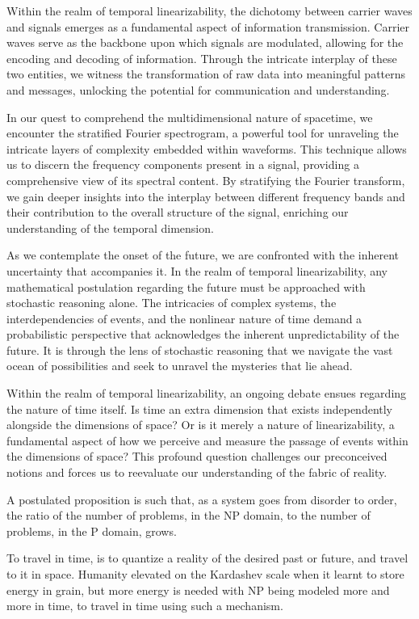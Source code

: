 \documentclass[ebook,12pt,oneside,openany]{memoir}
\begin{document}
\indent Within the realm of temporal linearizability, the dichotomy between carrier waves and signals emerges as a fundamental aspect of information transmission. Carrier waves serve as the backbone upon which signals are modulated, allowing for the encoding and decoding of information. Through the intricate interplay of these two entities, we witness the transformation of raw data into meaningful patterns and messages, unlocking the potential for communication and understanding.

\indent In our quest to comprehend the multidimensional nature of spacetime, we encounter the stratified Fourier spectrogram, a powerful tool for unraveling the intricate layers of complexity embedded within waveforms. This technique allows us to discern the frequency components present in a signal, providing a comprehensive view of its spectral content. By stratifying the Fourier transform, we gain deeper insights into the interplay between different frequency bands and their contribution to the overall structure of the signal, enriching our understanding of the temporal dimension.

\indent As we contemplate the onset of the future, we are confronted with the inherent uncertainty that accompanies it. In the realm of temporal linearizability, any mathematical postulation regarding the future must be approached with stochastic reasoning alone. The intricacies of complex systems, the interdependencies of events, and the nonlinear nature of time demand a probabilistic perspective that acknowledges the inherent unpredictability of the future. It is through the lens of stochastic reasoning that we navigate the vast ocean of possibilities and seek to unravel the mysteries that lie ahead.

\indent Within the realm of temporal linearizability, an ongoing debate ensues regarding the nature of time itself. Is time an extra dimension that exists independently alongside the dimensions of space? Or is it merely a nature of linearizability, a fundamental aspect of how we perceive and measure the passage of events within the dimensions of space? This profound question challenges our preconceived notions and forces us to reevaluate our understanding of the fabric of reality.

\indent A postulated proposition is such that, as a system goes from disorder to order, the ratio of the number of problems, in the NP domain, to the number of problems, in the P domain, grows.

\indent To travel in time, is to quantize a reality of the desired past or future, and travel to it in space. Humanity elevated on the Kardashev scale when it learnt to store energy in grain, but more energy is needed with NP being modeled more and more in time, to travel in time using such a mechanism.
\end{document}
